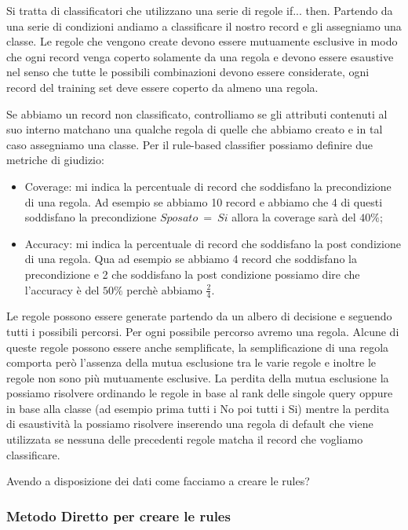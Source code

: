 \documentclass[14pt]{extreport}
\begin{document}
Si tratta di classificatori che utilizzano una serie di regole if... then.
Partendo da una serie di condizioni andiamo a classificare il nostro record e gli assegniamo una classe.
Le regole che vengono create devono essere mutuamente esclusive in modo che ogni record venga coperto solamente da una regola e devono essere esaustive nel senso che tutte le possibili combinazioni devono essere considerate, ogni record del training set deve essere coperto da almeno una regola.

Se abbiamo un record non classificato, controlliamo se gli attributi contenuti al suo interno matchano una qualche regola di quelle che abbiamo creato e in tal caso assegniamo una classe.
Per il rule-based classifier possiamo definire due metriche di giudizio:
\begin{itemize}
    \item Coverage: mi indica la percentuale di record che soddisfano la precondizione di una regola. Ad esempio se abbiamo 10 record e abbiamo che 4 di questi soddisfano la precondizione $Sposato\ =\ Si$ allora la coverage sarà del $40\%$;
    \item Accuracy: mi indica la percentuale di record che soddisfano la post condizione di una regola. Qua ad esempio se abbiamo 4 record che soddisfano la precondizione e 2 che soddisfano la post condizione possiamo dire che l'accuracy è del $50\%$ perchè abbiamo $\frac{2}{4}$.
\end{itemize}

Le regole possono essere generate partendo da un albero di decisione e seguendo tutti i possibili percorsi. Per ogni possibile percorso avremo una regola. Alcune di queste regole possono essere anche semplificate, la semplificazione di una regola comporta però l'assenza della mutua esclusione tra le varie regole e inoltre le regole non sono più mutuamente esclusive. La perdita della mutua esclusione la possiamo risolvere ordinando le regole in base al rank delle singole query oppure in base alla classe (ad esempio prima tutti i No poi tutti i Si) mentre la perdita di esaustività la possiamo risolvere inserendo una regola di default che viene utilizzata se nessuna delle precedenti regole matcha il record che vogliamo classificare.

Avendo a disposizione dei dati come facciamo a creare le rules?

\subsubsection{Metodo Diretto per creare le rules}
\end{document}

